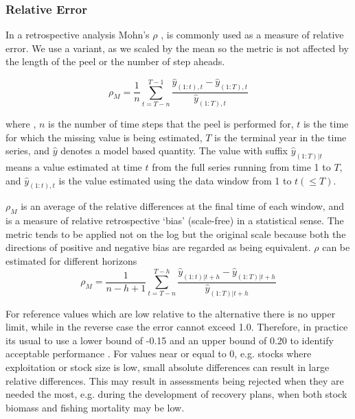 \documentclass[12pt,halfline,a4paper,nonumbib]{ouparticle}
\newcommand{\disp}{\displaystyle}
\begin{document}

\subsubsection{Relative Error}
 
In a retrospective analysis Mohn's $\rho$ \parencite{mohn1999retrospective}, is commonly used as a measure of relative error. We use a variant, as we scaled by the mean so the metric is not affected by the length of the peel or the number of step aheads.

\begin{equation}
\label{eqn:mohn}
\rho_{M} = \disp \frac{1}{n} \sum_{t=T-n}^{T-1} \frac{\hat{y}_{(1:t),t}-\hat{y}_{(1:T),t}}{\hat{y}_{(1:T),t}} 
\end{equation}

\noindent
where , $n$ is the number of time steps that the peel is performed for, $t$ is the time for which the missing value is being estimated, $T$ is the terminal year in the time series, and $\hat{y}$ denotes a model based quantity. The value with suffix $\hat{y}_{(1:T)|t}$ means a value estimated at time $t$ from the full series running from time 1 to $T$, and $\hat{y}_{(1:t),t}$ is the value estimated using the data window from 1 to $t (\leq T)$. 

$\rho_M$ is an average of the relative differences at the final time of each window, and is a measure of relative retrospective `bias' (scale-free) in a statistical sense. The metric tends to be applied not on the log but the original scale because both the directions of positive and negative bias are regarded as being equivalent. $\rho$ can be estimated for different horizons 
\begin{equation}
\label{eqn:mohn2}
\rho_{M} = \disp \frac{1}{n-h+1} \sum_{t=T-n}^{T-h} \frac{\hat{y}_{(1:t)|t+h}-\hat{y}_{(1:T)|t+h}}{\hat{y}_{(1:T)|t+h}} 
\end{equation}

For reference values which are low relative to the alternative there is no upper limit, while in the reverse case the error cannot exceed 1.0. Therefore, in practice its usual to use a lower bound of -0.15 and an upper bound of 0.20 to identify acceptable performance \parencite{hurtado2014looking}. For values near or equal to 0, e.g. stocks where exploitation or stock size is low, small absolute differences can result in large relative differences.  This may result in assessments being rejected when they are needed the most, e.g. during the development of recovery plans, when both stock biomass and fishing mortality may be low. 
\end{document}
